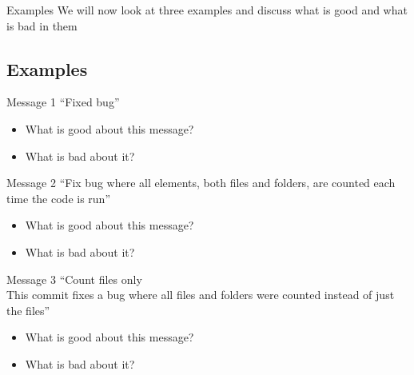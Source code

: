 \begin{frame}
\begin{block}{Examples}
    We will now look at three examples and discuss what is good and what is bad in them
\end{block}
\end{frame}

\subsection{Examples}
\begin{frame}
\begin{block}{Message 1}
    \enquote{Fixed bug}
\end{block}

\begin{question}
\begin{itemize}
    \pause
    \item What is good about this message?
    \pause
    \item What is bad about it?
\end{itemize}
\end{question}
    
\end{frame}

\begin{frame}
\begin{block}{Message 2}
    \enquote{Fix bug where all elements, both files and folders, are counted each time the code is run}
\end{block}

\begin{question}
\begin{itemize}
    \pause
    \item What is good about this message?
    \pause
    \item What is bad about it?
\end{itemize}
\end{question}
    
\end{frame}


\begin{frame}
\begin{block}{Message 3}
    \enquote{Count files only\\ \vspace{10 pt} 
    This commit fixes a bug where all files and folders were counted instead of just the files}
\end{block}

\begin{question}
\begin{itemize}
    \pause
    \item What is good about this message?
    \pause
    \item What is bad about it?
\end{itemize}
\end{question}
    
\end{frame}

